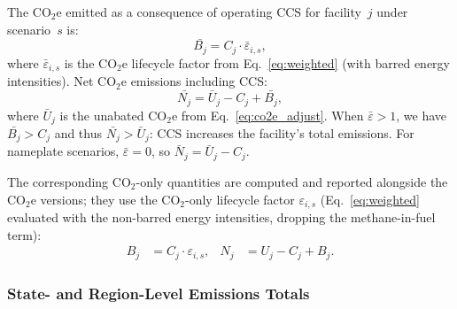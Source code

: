 \documentclass[11pt]{article}
\newcommand{\cotwo}{\ensuremath{\mathrm{CO_2}}}
\newcommand{\cotwoe}{\ensuremath{\mathrm{CO_{2}e}}}
\begin{document}
The \cotwoe{} emitted as a consequence of operating CCS for facility~$j$ under scenario~$s$ is:
%
\begin{equation}
  \bar{B_j} = C_j \cdot \bar{\varepsilon}_{i,s},
  \label{eq:ccs_emitted}
\end{equation}
%
where $\bar{\varepsilon}_{i,s}$ is the \cotwoe{} lifecycle factor from Eq.~\eqref{eq:weighted} (with barred energy intensities).
Net \cotwoe{} emissions including CCS:
%
\begin{equation}
  \bar{N_j} = \bar{U}_j - C_j + \bar{B_j},
  \label{eq:net}
\end{equation}
%
where $\bar{U}_j$ is the unabated \cotwoe{} from Eq.~\eqref{eq:co2e_adjust}.
When $\bar{\varepsilon} > 1$, we have $\bar{B_j} > C_j$ and thus $\bar{N_j} > \bar{U}_j$: CCS increases the facility's total emissions.
For nameplate scenarios, $\bar{\varepsilon} = 0$, so $\bar{N}_j = \bar{U}_j - C_j$.

The corresponding \cotwo{}-only quantities are computed and reported alongside the \cotwoe{} versions; they use the CO$_2$-only lifecycle factor $\varepsilon_{i,s}$ (Eq.~\ref{eq:weighted} evaluated with the non-barred energy intensities, dropping the methane-in-fuel term):
%
\begin{align}
    B_j &= C_j \cdot \varepsilon_{i,s}, & N_j &= U_j - C_j + B_j.
    \label{eq:ccs_emitted_co2}
\end{align}

\subsubsection{State- and Region-Level Emissions Totals}
\label{sec:state_totals}
\end{document}

